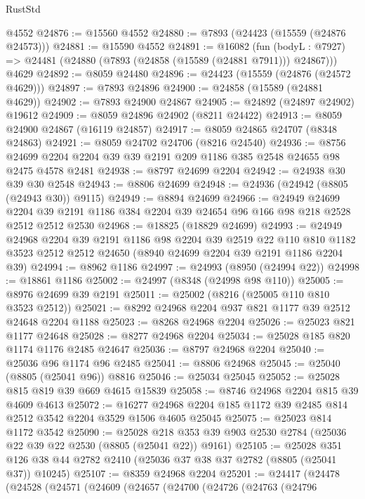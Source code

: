 \begin{lexlean}{RustStd}
\begin{coremodule}
    @4552
@24876 := @15560 @4552
@24880 := @7893 (@24423 (@15559 (@24876 @24573)))
@24881 := @15590 @4552
@24891 := @16082
    (fun (bodyL : @7927) => @24481 (@24880 (@7893 (@24858 (@15589 (@24881 @7911))) @24867)))
    @4629
@24892 := @8059 @24480
@24896 := @24423 (@15559 (@24876 (@24572 @4629)))
@24897 := @7893 @24896
@24900 := @24858 (@15589 (@24881 @4629))
@24902 := @7893 @24900 @24867
@24905 := @24892 (@24897 @24902) @19612
@24909 := @8059 @24896 @24902 (@8211 @24422)
@24913 := @8059 @24900 @24867 (@16119 @24857)
@24917 := @8059 @24865 @24707 (@8348 @24863)
@24921 := @8059 @24702 @24706 (@8216 @24540)
@24936 := @8756 @24699 @2204 @2204 @39 @39 @2191 @209 @1186 @385 @2548 @24655 @98 @2475 @4578 @2481
@24938 := @8797 @24699 @2204
@24942 := @24938 @30 @39 @30 @2548
@24943 := @8806 @24699
@24948 := @24936 (@24942 (@8805 (@24943 @30)) @9115)
@24949 := @8894 @24699
@24966 := @24949
    @24699
    @2204
    @39
    @2191
    @1186
    @384
    @2204
    @39
    @24654
    @96
    @166
    @98
    @218
    @2528
    @2512
    @2512
    @2530
@24968 := @18825 (@18829 @24699)
@24993 := @24949
    @24968
    @2204
    @39
    @2191
    @1186
    @98
    @2204
    @39
    @2519
    @22
    @110
    @810
    @1182
    @3523
    @2512
    @2512
    @24650
    (@8940 @24699 @2204 @39 @2191 @1186 @2204 @39)
@24994 := @8962 @1186
@24997 := @24993 (@8950 (@24994 @22))
@24998 := @18861 @1186
@25002 := @24997 (@8348 (@24998 @98 @110))
@25005 := @8976 @24699 @39 @2191
@25011 := @25002 (@8216 (@25005 @110 @810 @3523 @2512))
@25021 := @8292 @24968 @2204 @937 @821 @1177 @39 @2512 @24648 @2204 @1188
@25023 := @8268 @24968 @2204
@25026 := @25023 @821 @1177 @24648
@25028 := @8277 @24968 @2204
@25034 := @25028 @185 @820 @1174 @1176 @2485 @24647
@25036 := @8797 @24968 @2204
@25040 := @25036 @96 @1174 @96 @2485
@25041 := @8806 @24968
@25045 := @25040 (@8805 (@25041 @96)) @8816
@25046 := @25034 @25045
@25052 := @25028 @815 @819 @39 @669 @4615 @15839
@25058 := @8746 @24968 @2204 @815 @39 @4609 @4613
@25072 := @16277 @24968 @2204 @185 @1172 @39 @2485 @814 @2512 @3542 @2204 @3529 @1506 @4605 @25045
@25075 := @25023 @814 @1172 @3542
@25090 := @25028
    @218
    @353
    @39
    @903
    @2530
    @2784
    (@25036 @22 @39 @22 @2530 (@8805 (@25041 @22)) @9161)
@25105 := @25028
    @351
    @126
    @38
    @44
    @2782
    @2410
    (@25036 @37 @38 @37 @2782 (@8805 (@25041 @37)) @10245)
@25107 := @8359 @24968 @2204
@25201 := @24417
    (@24478
      (@24528
        (@24571
          (@24609
            (@24657
              (@24700
                (@24726
                  (@24763
                    (@24796

\end{coremodule}
\end{lexlean}
